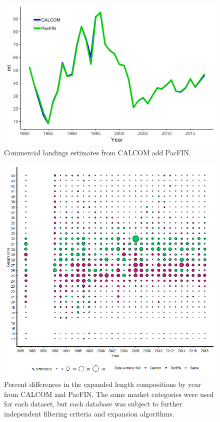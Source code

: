 \documentclass[12pt,]{article}
\begin{document}
\begin{figure}
\centering
\includegraphics{Figures/Calcom_vs_Pacfin.png}
\caption{Commercial landings estimates from CALCOM add PacFIN.
\label{fig:Calcom_vs_Pacfin}}
\end{figure}

\begin{figure}
\centering
\includegraphics{Figures/Calcom_vs_pacfin_lengths.png}
\caption{Percent differences in the expanded length compositions by year
from CALCOM and PacFIN. The same market categories were used for each
dataset, but each database was subject to further independent filtering
criteria and expansion algorithms. \label{fig:Calcom_vs_pacfin_lengths}}
\end{figure}
\end{document}

